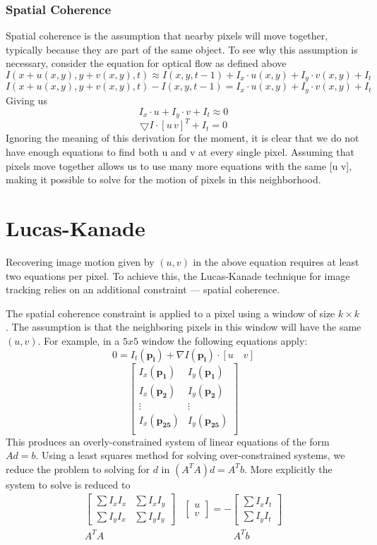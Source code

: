 \documentclass{article}
\begin{document}
\subsubsection{Spatial Coherence}
Spatial coherence is the assumption that nearby pixels will move together, typically because they are part of the same object. To see why this assumption is necessary, consider the equation for optical flow as defined above
\[ I(x + u(x,y),y + v(x,y),t) \approx I(x,y,t-1) + I_x \cdot u(x,y) + I_y \cdot v(x,y) + I_t \]
\[ I(x + u(x,y),y + v(x,y),t) - I(x,y,t-1) = I_x \cdot u(x,y) + I_y \cdot v(x,y) + I_t \]
Giving us 
\[I_x \cdot u + I_y \cdot v + I_t \approx 0 \]
\[ \bigtriangledown I \cdot [u \, v]^T + I_t = 0 \]
Ignoring the meaning of this derivation for the moment, it is clear that we do not have enough equations to find both u and v at every single pixel. Assuming that pixels move together allows us to use many more equations with the same [u v], making it possible to solve for the motion of pixels in this neighborhood.


\section{Lucas-Kanade}
Recovering image motion given by $(u,v)$ in the above equation requires at least two equations per pixel. To achieve this, the Lucas-Kanade \cite{lucas1981iterative} technique for image tracking relies on an additional constraint --- spatial coherence. 

The spatial coherence constraint is applied to a pixel using a window of size $k \times k$. The assumption is that the neighboring pixels in this window will have the same $(u,v)$. For example, in a $5x5$ window the following equations apply:
\[  0 = I_t(\mathbf{p_i}) + \nabla I(\mathbf{p_i}) \cdot [u \quad v] \]
\[ 
\begin{bmatrix}
	I_x(\mathbf{p_1}) & I_y(\mathbf{p_1}) \\
    I_x(\mathbf{p_2}) & I_y(\mathbf{p_2}) \\
    \vdots & \vdots \\
    I_x(\mathbf{p_{25}}) & I_y(\mathbf{p_{25}}) \\
\end{bmatrix}
\]
This produces an overly-constrained system of linear equations of the form $Ad=b$. Using a least squares method for solving over-constrained systems, we reduce the problem to solving for $d$ in $(A^TA)d=A^Tb$. More explicitly the system to solve is reduced to
\begin{align*}
\begin{bmatrix}
	\sum I_xI_x & \sum I_xI_y \\
    \sum I_yI_x & \sum I_yI_y
\end{bmatrix}&
\begin{bmatrix} u \\ v  \end{bmatrix} = 
- \begin{bmatrix} \sum I_xI_t \\ \sum I_yI_t \end{bmatrix} \\
A^TA \qquad \quad& \qquad \qquad \quad A^Tb
\end{align*}
\end{document}
